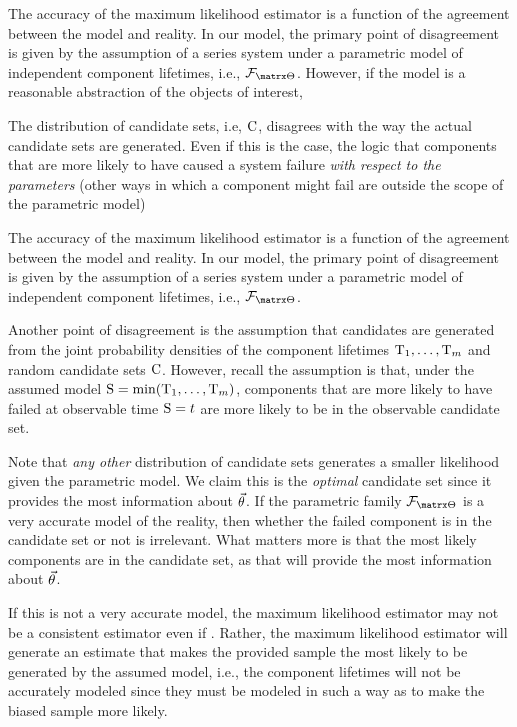 \documentclass[ ../main.tex]{subfiles}
\begin{document}
The accuracy of the maximum likelihood estimator is a function of the agreement between the model and reality.
In our model, the primary point of disagreement is given by the assumption of a series system under a parametric model of independent component lifetimes, i.e., $\pfam$.
However, if the model is a reasonable abstraction of the objects of interest, 

The distribution of candidate sets, i.e, $\mathrm{C}$, disagrees with the way the actual candidate sets are generated.
	Even if this is the case, the logic that components that are more likely to have caused a system failure \emph{with respect to the parameters} (other ways in which a component might fail are outside the scope of the parametric model)


The accuracy of the maximum likelihood estimator is a function of the agreement between the model and reality.
In our model, the primary point of disagreement is given by the assumption of a series system under a parametric model of independent component lifetimes, i.e., $\pfam$.

Another point of disagreement is the assumption that candidates are generated from the joint probability densities of the component lifetimes $\mathrm{T}_1,\ldots,\mathrm{T}_m$ and random candidate sets $\mathrm{C}$.
However, recall the assumption is that, under the assumed model $\mathrm{S} = \min(\mathrm{T}_1,\ldots,\mathrm{T}_m)$, components that are more likely to have failed at observable time $\mathrm{S} = t$ are more likely to be in the observable candidate set.

Note that \emph{any other} distribution of candidate sets generates a smaller likelihood given the parametric model.
We claim this is the \emph{optimal} candidate set since it provides the most information about $\vec{\theta}$.
If the parametric family $\pfam$ is a very accurate model of the reality, then whether the failed component is in the candidate set or not is irrelevant.
What matters more is that the most likely components are in the candidate set, as that will provide the most information about $\vec{\theta}$.



If this is not a very accurate model, the maximum likelihood estimator may not be a consistent estimator even if .
Rather, the maximum likelihood estimator will generate an estimate that makes the provided sample the most likely to be generated by the assumed model, i.e., the component lifetimes will not be accurately modeled since they must be modeled in such a way as to make the biased sample more likely.
\end{document}
